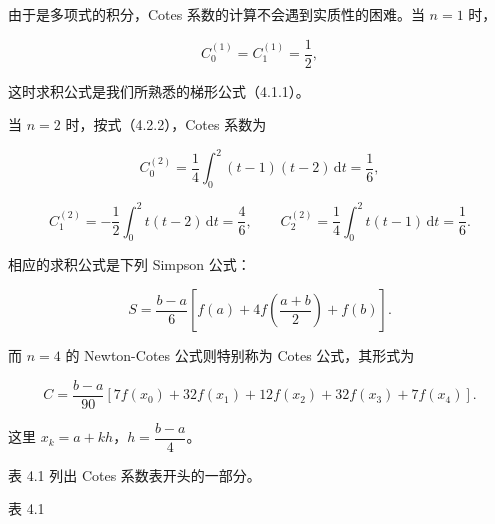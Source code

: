 由于是多项式的积分，Cotes 系数的计算不会遇到实质性的困难。当 \(n=1\) 时，

\[
C_0^{(1)}=C_1^{(1)}=\frac12,
\]

这时求积公式是我们所熟悉的梯形公式（4.1.1）。

当 \(n=2\) 时，按式（4.2.2），Cotes 系数为

\[
C_0^{(2)}=\frac14\int_0^2(t-1)(t-2)\,\mathrm{d}t=\frac16,
\]

\[
C_1^{(2)}=-\frac12\int_0^2t(t-2)\,\mathrm{d}t=\frac46,\qquad
C_2^{(2)}=\frac14\int_0^2t(t-1)\,\mathrm{d}t=\frac16.
\]

相应的求积公式是下列 Simpson 公式：

\[
S=\frac{b-a}{6}\left[f(a)+4f\left(\frac{a+b}{2}\right)+f(b)\right].
\tag{4.2.3}
\]

而 \(n=4\) 的 Newton-Cotes 公式则特别称为 Cotes 公式，其形式为

\[
C=\frac{b-a}{90}[7f(x_0)+32f(x_1)+12f(x_2)+32f(x_3)+7f(x_4)].
\tag{4.2.4}
\]

这里 \(x_k=a+kh\)，\(h=\dfrac{b-a}{4}\)。

表 4.1 列出 Cotes 系数表开头的一部分。

表 4.1

